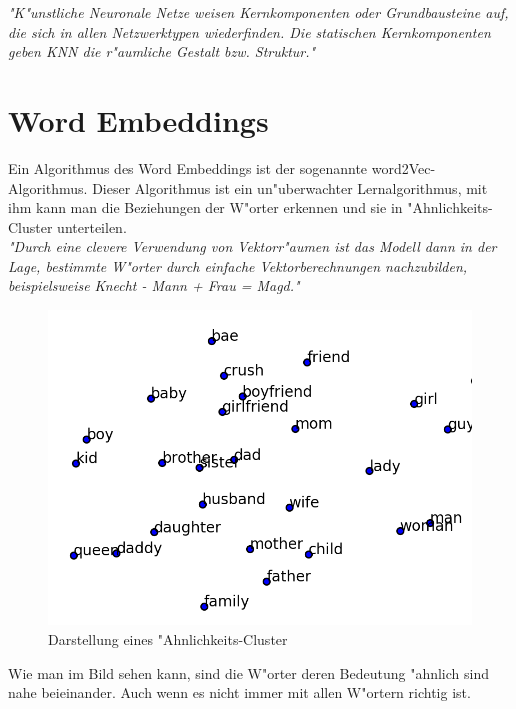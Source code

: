 \textit{"K"unstliche Neuronale Netze weisen Kernkomponenten oder Grundbausteine auf, die sich in allen Netzwerktypen wiederfinden. Die statischen Kernkomponenten geben  \acs{KNN} die r"aumliche Gestalt bzw. Struktur."}
\cite{Strecker97}


\section{Word Embeddings}
Ein Algorithmus des Word Embeddings ist der sogenannte word2Vec-Algorithmus. Dieser Algorithmus ist ein un"uberwachter Lernalgorithmus, mit ihm kann man die Beziehungen der W"orter erkennen und sie in "Ahnlichkeits-Cluster unterteilen.\\
\textit{"Durch eine clevere Verwendung von Vektorr"aumen ist das Modell dann in der Lage, bestimmte W"orter durch einfache Vektorberechnungen nachzubilden, beispielsweise Knecht - Mann + Frau = Magd."}
\cite{raschka:2017}
\begin{figure}[bth]
\includegraphics[width=15cm]{Graphics/cluster.png}\caption["Ahnlichkeits-Cluster]{Darstellung eines "Ahnlichkeits-Cluster  \cite{marivate:2017}}
\end{figure}

Wie man im Bild sehen kann, sind die W"orter deren Bedeutung "ahnlich sind nahe beieinander. Auch wenn es nicht immer mit allen W"ortern richtig ist. 

\pagebreak
